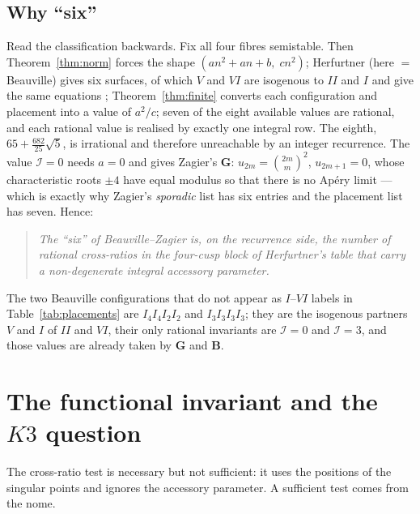 \documentclass[11pt,reqno]{amsart}
\theoremstyle{plain}
\theoremstyle{definition}
\theoremstyle{remark}
\theoremstyle{plain}
\begin{document}
\subsection{Why ``six''}\label{sec:whysix}

Read the classification backwards. Fix all four fibres semistable. Then
Theorem~\ref{thm:norm} forces the shape $(an^2+an+b,\;cn^2)$;
Herfurtner (here $=$ Beauville) gives six surfaces, of which $V$ and $VI$ are
isogenous to $II$ and $I$ and give the same equations \cite[\S7]{Zagier2009};
Theorem~\ref{thm:finite} converts each configuration and placement into a value
of $a^2/c$; seven of the eight available values are rational, and each rational
value is realised by exactly one integral row. The eighth,
$65+\tfrac{682}{25}\sqrt5$, is irrational and therefore unreachable by an
integer recurrence. The value $\mathcal I=0$ needs $a=0$ and gives Zagier's
$\mathbf G$: $u_{2m}=\binom{2m}m^2$, $u_{2m+1}=0$, whose characteristic roots
$\pm4$ have equal modulus so that there is no Ap\'ery limit --- which is exactly
why Zagier's \emph{sporadic} list has six entries and the placement list has
seven. Hence:

\begin{quote}
\emph{The ``six'' of Beauville--Zagier is, on the recurrence side, the number of
rational cross-ratios in the four-cusp block of Herfurtner's table that carry a
non-degenerate integral accessory parameter.}
\end{quote}

The two Beauville configurations that do not appear as $I$--$VI$ labels in
Table~\ref{tab:placements} are $I_4I_4I_2I_2$ and $I_3I_3I_3I_3$; they are the
isogenous partners $V$ and $I$ of $II$ and $VI$, their only rational invariants
are $\mathcal I=0$ and $\mathcal I=3$, and those values are already taken by
$\mathbf G$ and $\mathbf B$.

\section{The functional invariant and the $K3$ question}\label{sec:J}

The cross-ratio test is necessary but not sufficient: it uses the positions of
the singular points and ignores the accessory parameter. A sufficient test comes
from the nome.
\end{document}
